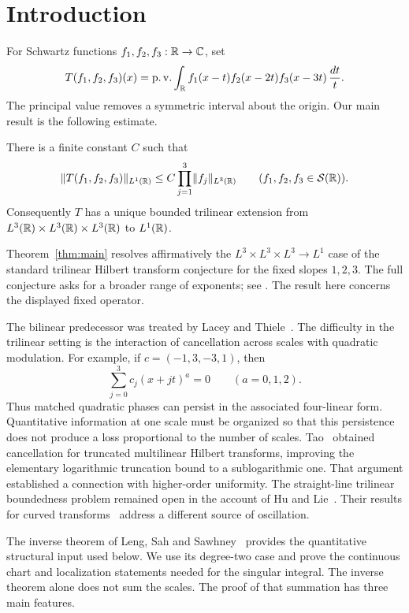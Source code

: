 \section{Introduction}\label{sec:introduction}
For Schwartz functions $f_1,f_2,f_3:\mathbb R\to\mathbb C$, set
\[
T(f_1,f_2,f_3)(x)
 =\operatorname{p.v.}\int_{\mathbb R}
 f_1(x-t)f_2(x-2t)f_3(x-3t)\,\frac{dt}{t}.
\]
The principal value removes a symmetric interval about the origin.
Our main result is the following estimate.

\begin{theorem}\label{thm:main}
There is a finite constant $C$ such that
\[
 \lVert T(f_1,f_2,f_3)\rVert_{L^1(\mathbb R)}
 \le C\prod_{j=1}^3\lVert f_j\rVert_{L^3(\mathbb R)}
 \qquad(f_1,f_2,f_3\in\mathcal S(\mathbb R)).
\]
Consequently $T$ has a unique bounded trilinear extension from
$L^3(\mathbb R)\times L^3(\mathbb R)\times L^3(\mathbb R)$ to $L^1(\mathbb R)$.
\end{theorem}

Theorem~\ref{thm:main} resolves affirmatively the
$L^3\times L^3\times L^3\to L^1$ case of the standard trilinear
Hilbert transform conjecture for the fixed slopes $1,2,3$.
The full conjecture asks for a broader range of exponents; see
\cite[Conjecture~1.7]{HuLie2023}.
The result here concerns the displayed fixed operator.

The bilinear predecessor was treated by Lacey and Thiele~\cite{LT1997,LT1999}.
The difficulty in the trilinear setting is the interaction of cancellation across scales with
quadratic modulation.  For example, if
$c=(-1,3,-3,1)$, then
\[
 \sum_{j=0}^3c_j(x+jt)^a=0\qquad(a=0,1,2).
\]
Thus matched quadratic phases can persist in the associated four-linear
form.  Quantitative information at one scale must be organized so that
this persistence does not produce a loss proportional to the number
of scales.
Tao~\cite{Tao2015} obtained cancellation for truncated multilinear
Hilbert transforms, improving the elementary logarithmic truncation
bound to a sublogarithmic one.  That argument established a connection
with higher-order uniformity.  The straight-line trilinear boundedness
problem remained open in the account of Hu and Lie~\cite[Section~1.2]{HuLie2025}.
Their results for curved transforms~\cite{HuLie2023,HuLie2025} address
a different source of oscillation.

The inverse theorem of Leng, Sah and Sawhney~\cite[Theorem~1.2]{LSS2024}
provides the quantitative structural input used below.  We use its
degree-two case and prove the continuous chart and localization
statements needed for the singular integral.  The inverse theorem alone
does not sum the scales.  The proof of that summation has three main
features.

